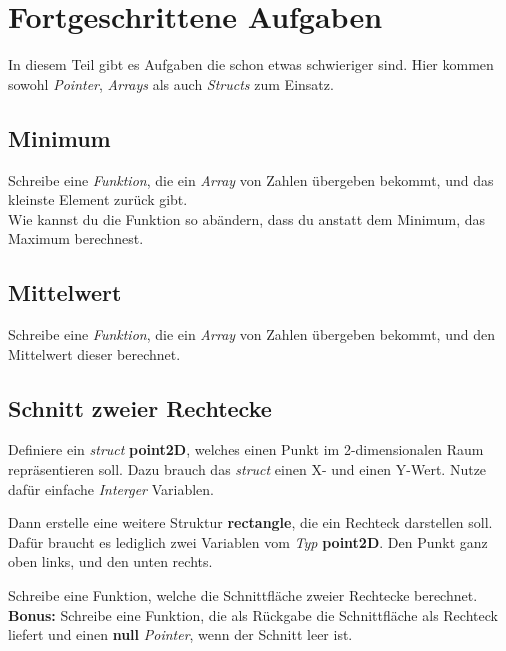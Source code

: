 \documentclass[c_worksheet.tex]{subfiles}
\begin{document}
	
\chapter{Fortgeschrittene Aufgaben}

In diesem Teil gibt es Aufgaben die schon etwas schwieriger sind. Hier kommen sowohl \emph{Pointer}, \emph{Arrays} als auch \emph{Structs} zum Einsatz.


\section{Minimum}


Schreibe eine \emph{Funktion}, die ein \emph{Array} von Zahlen übergeben bekommt, und das kleinste Element zurück gibt. \\

Wie kannst du die Funktion so abändern, dass du anstatt dem Minimum, das Maximum berechnest. 



\section{Mittelwert}

Schreibe eine \emph{Funktion}, die ein \emph{Array} von Zahlen übergeben bekommt, und den Mittelwert dieser berechnet.



\section{Schnitt zweier Rechtecke}

Definiere ein \emph{struct} \textbf{point2D}, welches einen Punkt im 2-dimensionalen Raum repräsentieren soll. Dazu brauch das \emph{struct} einen X- und einen Y-Wert. Nutze dafür einfache \emph{Interger} Variablen.

Dann erstelle eine weitere Struktur \textbf{rectangle}, die ein Rechteck darstellen soll. Dafür braucht es lediglich zwei Variablen vom \emph{Typ} \textbf{point2D}. Den Punkt ganz oben links, und den unten rechts.

Schreibe eine Funktion, welche die Schnittfläche zweier Rechtecke berechnet.\\

\textbf{Bonus:} Schreibe eine Funktion, die als Rückgabe die Schnittfläche als Rechteck liefert und einen \textbf{null} \emph{Pointer}, wenn der Schnitt leer ist.
\end{document}
